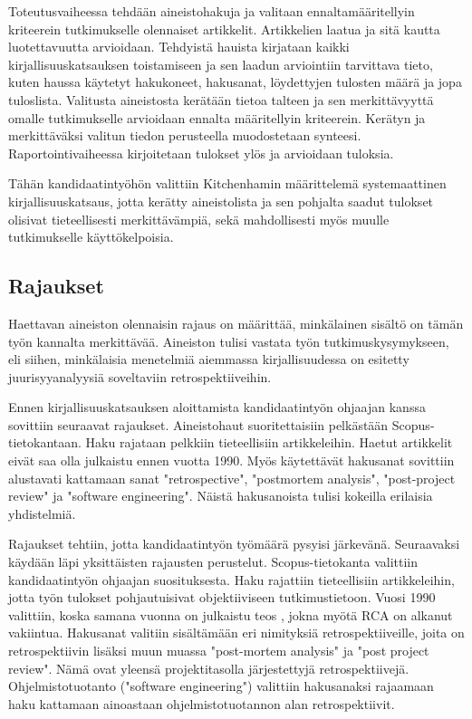 Toteutusvaiheessa tehdään aineistohakuja ja valitaan ennaltamääritellyin kriteerein tutkimukselle olennaiset artikkelit. Artikkelien laatua ja sitä kautta luotettavuutta arvioidaan. Tehdyistä hauista kirjataan kaikki kirjallisuuskatsauksen toistamiseen ja sen laadun arviointiin tarvittava tieto, kuten haussa käytetyt hakukoneet, hakusanat, löydettyjen tulosten määrä ja jopa tuloslista. Valitusta aineistosta kerätään tietoa talteen ja sen merkittävyyttä omalle tutkimukselle arvioidaan ennalta määritellyin kriteerein. Kerätyn ja merkittäväksi valitun tiedon perusteella muodostetaan synteesi. Raportointivaiheessa kirjoitetaan tulokset ylös ja arvioidaan tuloksia. \citep{Kitchenham2007}

Tähän kandidaatintyöhön valittiin Kitchenhamin määrittelemä systemaattinen kirjallisuuskatsaus, jotta kerätty aineistolista ja sen pohjalta saadut tulokset olisivat tieteellisesti merkittävämpiä, sekä mahdollisesti myös muulle tutkimukselle käyttökelpoisia.

\subsection{Rajaukset}
Haettavan aineiston olennaisin rajaus on määrittää, minkälainen sisältö on tämän työn kannalta merkittävää. Aineiston tulisi vastata työn tutkimuskysymykseen, eli siihen, minkälaisia menetelmiä aiemmassa kirjallisuudessa on esitetty juurisyyanalyysiä soveltaviin retrospektiiveihin.

Ennen kirjallisuuskatsauksen aloittamista kandidaatintyön ohjaajan kanssa sovittiin seuraavat rajaukset. Aineistohaut suoritettaisiin pelkästään Scopus-tietokantaan. Haku rajataan pelkkiin tieteellisiin artikkeleihin. Haetut artikkelit eivät saa olla julkaistu ennen vuotta 1990. Myös käytettävät hakusanat sovittiin alustavati kattamaan sanat "retrospective",  "postmortem analysis", "post-project review" ja "software engineering". Näistä hakusanoista tulisi kokeilla erilaisia yhdistelmiä.

Rajaukset tehtiin, jotta kandidaatintyön työmäärä pysyisi järkevänä. Seuraavaksi käydään läpi yksittäisten rajausten perustelut. Scopus-tietokanta valittiin kandidaatintyön ohjaajan suosituksesta. Haku rajattiin tieteellisiin artikkeleihin, jotta työn tulokset pohjautuisivat objektiiviseen tutkimustietoon. Vuosi 1990 valittiin, koska samana vuonna on julkaistu teos \citep{ishikawa1990introduction}, jokna myötä RCA on alkanut vakiintua. Hakusanat valitiin sisältämään eri nimityksiä retrospektiiveille, joita on retrospektiivin lisäksi muun muassa "post-mortem analysis" ja "post project review". Nämä ovat yleensä projektitasolla järjestettyjä retrospektiivejä. Ohjelmistotuotanto ("software engineering") valittiin hakusanaksi rajaamaan haku kattamaan ainoastaan ohjelmistotuotannon alan retrospektiivit.

